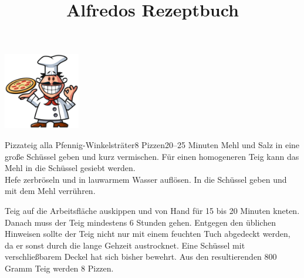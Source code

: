 \documentclass[12pt]{article}
\title{Alfredos Rezeptbuch}
\date{}
\begin{document}
\maketitle

\vspace{-1.5cm}
\centering
\includegraphics[width=0.25\textwidth]{alfredo.png}

\begin{recipe}{Pizzateig alla Pfennig-Winkelsträter}{8 Pizzen}{20--25 Minuten}
	Mehl und Salz in eine große Schüssel geben und kurz vermischen.
	Für einen homogeneren Teig kann das Mehl in die Schüssel gesiebt werden.
	\\	

	Hefe zerbröseln und in lauwarmem Wasser auflösen.
	In die Schüssel geben und mit dem Mehl verrühren.
	\\

	\freeform
	
	Teig auf die Arbeitsfläche auskippen und von Hand für 15 bis 20 Minuten kneten.
	Danach muss der Teig mindestens 6 Stunden gehen.
	Entgegen den üblichen Hinweisen sollte der Teig nicht nur mit einem feuchten Tuch abgedeckt werden, da er sonst durch die lange Gehzeit austrocknet.
	Eine Schüssel mit verschließbarem Deckel hat sich bisher bewehrt.
 	Aus den resultierenden 800 Gramm Teig werden 8 Pizzen.
\end{recipe}
\end{document}
